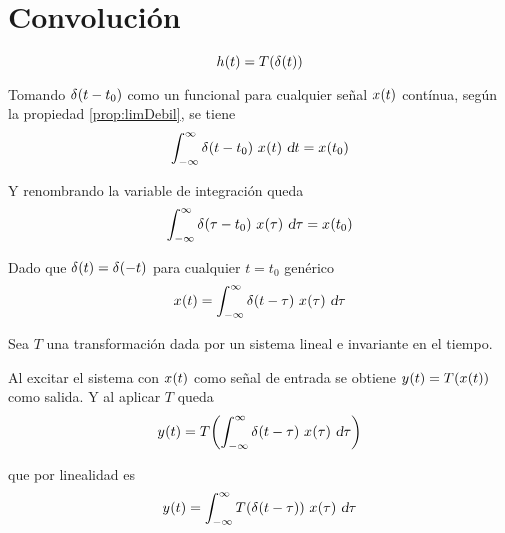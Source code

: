 \chapter{Convolución}

\begin{mdframed}[style=PropertyFrame]
    \begin{defn}
    \end{defn}
    \begin{equation*}
        \fx[h]{t} = \fx[T]{\fx[\delta]{t}}
    \end{equation*}
\end{mdframed}

Tomando $\fx[\delta]{t-t_0}$ como un funcional para cualquier señal $\fx[x]{t}$ contínua, según la propiedad \ref{prop:limDebil}, se tiene
\begin{equation*}
    \int_{-\infty}^\infty \fx[\delta]{t-t_0} \, \fx[x]{t} \, \dif t = \fx[x]{t_0}
\end{equation*}

Y renombrando la variable de integración queda
\begin{equation*}
    \int_{-\infty}^\infty \fx[\delta]{\tau-t_0} \, \fx[x]{\tau} \, \dif \tau = \fx[x]{t_0}
\end{equation*}

Dado que $\fx[\delta]{t} = \fx[\delta]{-t}$ para cualquier $t=t_0$ genérico
\begin{equation*}
    \fx[x]{t} = \int_{-\infty}^\infty \fx[\delta]{t-\tau} \, \fx[x]{\tau} \, \dif \tau
\end{equation*}

Sea $T$ una transformación dada por un sistema lineal e invariante en el tiempo.

Al excitar el sistema con $\fx[x]{t}$ como señal de entrada se obtiene $\fx[y]{t} = \fx[T]{\fx[x]{t}}$ como salida. Y al aplicar $T$ queda
\begin{equation*}
    \fx[y]{t} = \fx[T]{ \int_{-\infty}^\infty \fx[\delta]{t-\tau} \, \fx[x]{\tau} \, \dif \tau }
\end{equation*}

que por linealidad es
\begin{equation*}
    \fx[y]{t} = \int_{-\infty}^\infty \fx[T]{\fx[\delta]{t-\tau}} \, \fx[x]{\tau} \, \dif \tau
\end{equation*}

